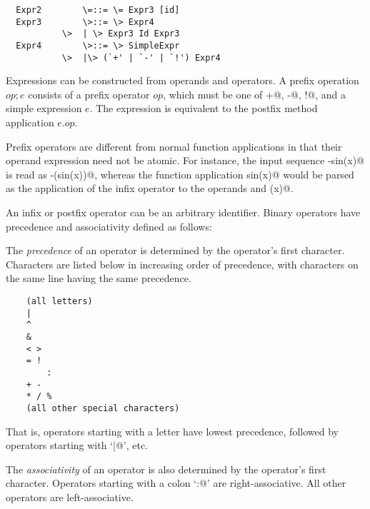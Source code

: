 \documentclass[11pt]{report}
\begin{document}
\syntax\begin{verbatim}
  Expr2        \=::= \= Expr3 [id]
  Expr3        \>::= \> Expr4
	       \>  | \> Expr3 Id Expr3
  Expr4        \>::= \> SimpleExpr
	       \>  |\> (`+' | `-' | `!') Expr4
\end{verbatim}

Expressions can be constructed from operands and operators.  A prefix
operation $op;e$ consists of a prefix operator $op$, which must be one
of \verb@+@, \verb@-@, \verb@!@, and a simple expression $e$.  The
expression is equivalent to the postfix method application $e.op$.

Prefix operators are different from normal function applications in
that their operand expression need not be atomic. For instance, the
input sequence \verb@-sin(x)@ is read as \verb@-(sin(x))@, whereas the
function application \verb@negate sin(x)@ would be parsed as the
application of the infix operator \verb@sin@ to the operands
\verb@negate@ and \verb@(x)@.

An infix or postfix operator can be an arbitrary identifier. Binary
operators have precedence and associativity defined as follows:

The {\em precedence} of an operator is determined by the operator's first
character. Characters are listed below in increasing order of
precedence, with characters on the same line having the same precedence.
\begin{verbatim}
	(all letters)
	|
	^
	&
	< >
	= !
        :
	+ -
	* / %
	(all other special characters)
\end{verbatim}
That is, operators starting with a letter have lowest precedence,
followed by operators starting with `\verb@|@', etc.

The {\em associativity} of an operator
is also determined by the operator's first character.
 Operators starting with a colon
`\verb@:@' are right-associative. All other operators are left-associative.
\end{document}
